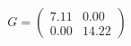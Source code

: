\documentclass[preview]{standalone}
\begin{document}
\begin{align*}
G = \begin{pmatrix} 7.11 & 0.00 \\ 0.00 & 14.22 \end{pmatrix}
\end{align*}
\end{document}
